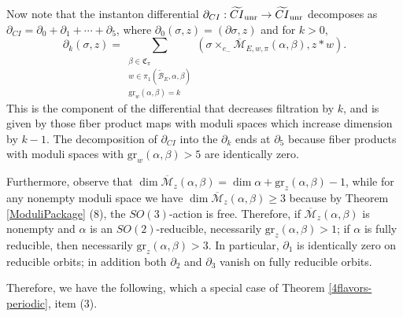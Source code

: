 \documentclass{memo-l}
\theoremstyle{definition}
\theoremstyle{remark}
\numberwithin{section}{chapter}
\numberwithin{equation}{chapter}
\begin{document}
Now note that the instanton differential $\partial_{CI}: \widetilde{CI}_\textup{unr} \to \widetilde{CI}_\textup{unr}$ decomposes as $\partial_{CI} = \partial_0 + \partial_1 + \cdots + \partial_5$, where $\partial_0(\sigma, z) = (\partial \sigma, z)$ and for $k>0$, $$\partial_{k}(\sigma, z) = \sum_{\substack{\beta \in \mathfrak C_\pi \\ w \in \pi_1(\widetilde{\mathcal B}_E, \alpha, \beta)\\ \text{gr}_w(\alpha, \beta) = k}} \left(\sigma \times_{e_-} \overline{\mathcal M}_{E,w,\pi}(\alpha, \beta),z*w\right).$$ This is the component of the differential that decreases filtration by $k$, and is given by those fiber product maps with moduli spaces which increase dimension by $k-1$. The decomposition of $\partial_{CI}$ into the $\partial_k$ ends at $\partial_5$ because fiber products with moduli spaces with $\text{gr}_w(\alpha, \beta) > 5$ are identically zero. 

Furthermore, observe that $\dim \overline{\mathcal M}_z(\alpha, \beta) = \dim \alpha + \text{gr}_z(\alpha, \beta) - 1$, while for any nonempty moduli space we have $\dim \overline{\mathcal M}_z(\alpha, \beta) \geq 3$ because by Theorem \ref{ModuliPackage} (8), the $SO(3)$-action is free. Therefore, if $\overline{\mathcal M}_z(\alpha, \beta)$ is nonempty and $\alpha$ is an $SO(2)$-reducible, necessarily $\text{gr}_z(\alpha, \beta) > 1$; if $\alpha$ is fully reducible, then necessarily $\text{gr}_z(\alpha, \beta) > 3$. In particular, $\partial_1$ is identically zero on reducible orbits; in addition both $\partial_2$ and $\partial_3$ vanish on fully reducible orbits.

Therefore, we have the following, which a special case of Theorem \ref{4flavors-periodic}, item (3).
\end{document}
